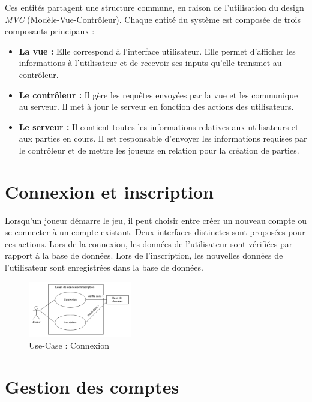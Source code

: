 \documentclass{report}
\begin{document}
\noindent Ces entités partagent une structure commune, en raison de l'utilisation du design \emph{MVC} (Modèle-Vue-Contrôleur). Chaque entité du système est composée de trois composants principaux :  
\begin{itemize}
    \item \textbf{La vue :} Elle correspond à l'interface utilisateur. Elle permet d'afficher les informations à l'utilisateur et de recevoir ses inputs qu'elle transmet au contrôleur.  
    \item \textbf{Le contrôleur :} Il gère les requêtes envoyées par la vue et les communique au serveur. Il met à jour le serveur en fonction des actions des utilisateurs.  
    \item \textbf{Le serveur :} Il contient toutes les informations relatives aux utilisateurs et aux parties en cours. Il est responsable d'envoyer les informations requises par le contrôleur et de mettre les joueurs en relation pour la création de parties.
\end{itemize}

\section{Connexion et inscription}

\noindent Lorsqu'un joueur démarre le jeu, il peut choisir entre créer un nouveau compte ou se connecter à un compte existant. Deux interfaces distinctes sont proposées pour ces actions. Lors de la connexion, les données de l'utilisateur sont vérifiées par rapport à la base de données. Lors de l'inscription, les nouvelles données de l'utilisateur sont enregistrées dans la base de données.

\vspace{-1em}

\begin{figure}[H]
    \centering
     \includegraphics[width=0.4\textwidth, keepaspectratio]{src/design/connexion_design.png}
    \caption{Use-Case : Connexion}
    \label{fig:use_case_connexion_design}
\end{figure}

\section{Gestion des comptes}
\end{document}
